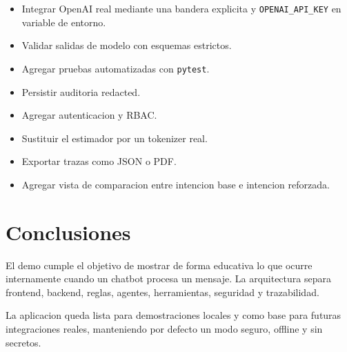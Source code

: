 \documentclass[12pt,letterpaper]{article}
\begin{document}
\begin{itemize}
  \item Integrar OpenAI real mediante una bandera explicita y \texttt{OPENAI\_API\_KEY} en variable de entorno.
  \item Validar salidas de modelo con esquemas estrictos.
  \item Agregar pruebas automatizadas con \texttt{pytest}.
  \item Persistir auditoria redacted.
  \item Agregar autenticacion y RBAC.
  \item Sustituir el estimador por un tokenizer real.
  \item Exportar trazas como JSON o PDF.
  \item Agregar vista de comparacion entre intencion base e intencion reforzada.
\end{itemize}

\section{Conclusiones}

El demo cumple el objetivo de mostrar de forma educativa lo que ocurre internamente cuando un chatbot procesa un mensaje. La arquitectura separa frontend, backend, reglas, agentes, herramientas, seguridad y trazabilidad.

La aplicacion queda lista para demostraciones locales y como base para futuras integraciones reales, manteniendo por defecto un modo seguro, offline y sin secretos.
\end{document}
